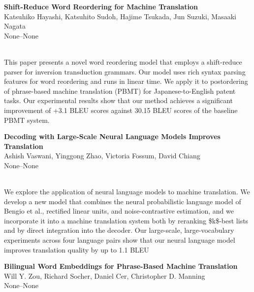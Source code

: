 \documentclass[twoside,makeidx]{book}
\renewcommand{\normalsize}{\fontsize{8}{9}\selectfont}
\renewcommand{\small}{\fontsize{7}{8}\selectfont}
\begin{document}
\par\vspace{2em}\noindent%
\begin{minipage}{\linewidth}%
\begin{center}
\textbf{\normalsize Shift-Reduce Word Reordering for Machine Translation}\\
\normalsize  Katsuhiko Hayashi,  Katsuhito Sudoh,  Hajime Tsukada,  Jun Suzuki,  Masaaki Nagata\\
{\small None--None}\\
\end{center}
\end{minipage}\\[0.5em]
\nopagebreak%
\noindent%
{\small This paper presents a novel word reordering model that employs a shift-reduce parser for inversion transduction grammars. Our model uses rich syntax parsing features for word reordering and runs in linear time. We apply it to postordering of phrase-based machine translation (PBMT) for Japanese-to-English patent tasks. Our experimental results show that our method achieves a significant improvement of +3.1 BLEU scores against 30.15 BLEU scores of the baseline PBMT system.}
\par\vspace{2em}\noindent%
\begin{minipage}{\linewidth}%
\begin{center}
\textbf{\normalsize Decoding with Large-Scale Neural Language Models Improves Translation}\\
\normalsize  Ashish Vaswani,  Yinggong Zhao,  Victoria Fossum,  David Chiang\\
{\small None--None}\\
\end{center}
\end{minipage}\\[0.5em]
\nopagebreak%
\noindent%
{\small We explore the application of neural language models to machine translation. We develop a new model that combines the neural probabilistic language model of Bengio et al., rectified linear units, and noise-contrastive estimation, and we incorporate it into a machine translation system both by reranking \$k\$-best lists and by direct integration into the decoder. Our large-scale, large-vocabulary experiments across four language pairs show that our neural language model improves translation quality by up to 1.1 BLEU}
\par\vspace{2em}\noindent%
\begin{minipage}{\linewidth}%
\begin{center}
\textbf{\normalsize Bilingual Word Embeddings for Phrase-Based Machine Translation}\\
\normalsize  Will Y. Zou,  Richard Socher,  Daniel Cer,  Christopher D. Manning\\
{\small None--None}\\
\end{center}
\end{minipage}\\[0.5em]
\end{document}
